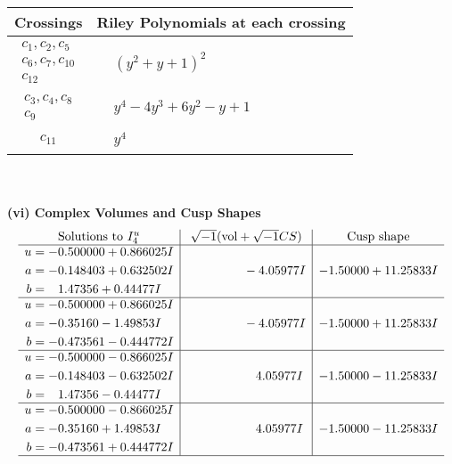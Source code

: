 \documentclass[1p]{elsarticle_modified}
\theoremstyle{definition}
\newcommand{\I}{\sqrt{-1}}
\begin{document}
\begin{tabular}{m{50pt}|m{274pt}}
Crossings & \hspace{64pt}Riley Polynomials at each crossing \\
\hline $$\begin{aligned}c_{1},c_{2},c_{5}\\c_{6},c_{7},c_{10}\\c_{12}\end{aligned}$$&$\begin{aligned}
&(y^2+y+1)^2
\end{aligned}$\\
\hline $$\begin{aligned}c_{3},c_{4},c_{8}\\c_{9}\end{aligned}$$&$\begin{aligned}
&y^4-4 y^3+6 y^2- y+1
\end{aligned}$\\
\hline $$\begin{aligned}c_{11}\end{aligned}$$&$\begin{aligned}
&y^4
\end{aligned}$\\
\hline
\end{tabular}\\~\\
\newpage\flushleft \textbf{(vi) Complex Volumes and Cusp Shapes}
$$\begin{array}{c|c|c}  
\text{Solutions to }I^u_{4}& \I (\text{vol} + \sqrt{-1}CS) & \text{Cusp shape}\\
 \hline 
\begin{aligned}
u &= -0.500000 + 0.866025 I \\
a &= -0.148403 + 0.632502 I \\
b &= \phantom{-}1.47356 + 0.44477 I\end{aligned}
 & \phantom{-0.000000 } -4.05977 I & -1.50000 + 11.25833 I \\ \hline\begin{aligned}
u &= -0.500000 + 0.866025 I \\
a &= -0.35160 - 1.49853 I \\
b &= -0.473561 - 0.444772 I\end{aligned}
 & \phantom{-0.000000 } -4.05977 I & -1.50000 + 11.25833 I \\ \hline\begin{aligned}
u &= -0.500000 - 0.866025 I \\
a &= -0.148403 - 0.632502 I \\
b &= \phantom{-}1.47356 - 0.44477 I\end{aligned}
 & \phantom{-0.000000 -}4.05977 I & -1.50000 - 11.25833 I \\ \hline\begin{aligned}
u &= -0.500000 - 0.866025 I \\
a &= -0.35160 + 1.49853 I \\
b &= -0.473561 + 0.444772 I\end{aligned}
 & \phantom{-0.000000 -}4.05977 I & -1.50000 - 11.25833 I\\
 \hline 
 \end{array}$$\newpage\newpage\renewcommand{\arraystretch}{1}
\end{document}
